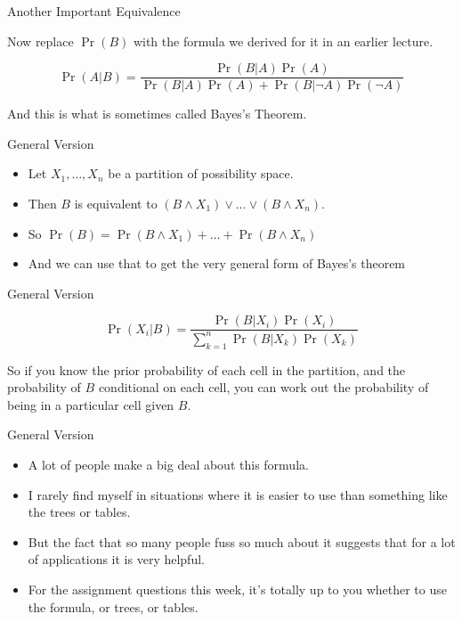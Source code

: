 \documentclass[
  ignorenonframetext,
]{beamer}
\providecommand{\tightlist}{%
  \setlength{\itemsep}{0pt}\setlength{\parskip}{0pt}}
\renewcommand{\,}{\text{, }}
\begin{document}
\begin{frame}{Another Important Equivalence}
\protect\hypertarget{another-important-equivalence-2}{}

Now replace \(\Pr(B)\) with the formula we derived for it in an earlier
lecture.

\[
\Pr(A | B) = \frac{\Pr(B | A)\Pr(A)}{\Pr(B | A)\Pr(A) + \Pr(B | \neg A)\Pr(\neg A)}
\]

And this is what is sometimes called Bayes's Theorem.

\end{frame}

\begin{frame}{General Version}
\protect\hypertarget{general-version}{}

\begin{itemize}
\tightlist
\item
  Let \(X_1, \dots, X_n\) be a partition of possibility space.
\item
  Then \(B\) is equivalent to
  \((B \wedge X_1) \vee \dots \vee (B \wedge X_n)\).
\item
  So \(\Pr(B) = \Pr(B \wedge X_1) + \dots + \Pr(B \wedge X_n)\)
\item
  And we can use that to get the very general form of Bayes's theorem
\end{itemize}

\end{frame}

\begin{frame}{General Version}
\protect\hypertarget{general-version-1}{}

\[
\Pr(X_i | B) = \frac{\Pr(B | X_i)\Pr(X_i)}{\sum_{k=1}^n \Pr(B | X_k)\Pr(X_k)}
\]

So if you know the prior probability of each cell in the partition, and
the probability of \(B\) conditional on each cell, you can work out the
probability of being in a particular cell given \(B\).

\end{frame}

\begin{frame}{General Version}
\protect\hypertarget{general-version-2}{}

\begin{itemize}
\tightlist
\item
  A lot of people make a big deal about this formula.
\item
  I rarely find myself in situations where it is easier to use than
  something like the trees or tables.
\item
  But the fact that so many people fuss so much about it suggests that
  for a lot of applications it is very helpful.
\item
  For the assignment questions this week, it's totally up to you whether
  to use the formula, or trees, or tables.
\end{itemize}

\end{frame}
\end{document}
